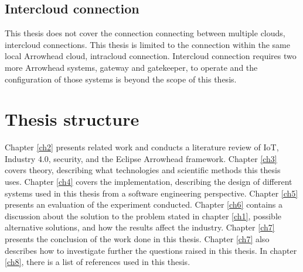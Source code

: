 \subsection{Intercloud connection}
This thesis does not cover the connection connecting between multiple clouds, intercloud connections. 
This thesis is limited to the connection within the same local Arrowhead cloud, intracloud connection.  
Intercloud connection requires two more Arrowhead systems, gateway and gatekeeper, to operate and the configuration of those systems is beyond the scope of this thesis.

\section{Thesis structure}
Chapter \ref{ch2} presents related work and conducts a literature review of IoT, Industry 4.0, security, and the Eclipse Arrowhead framework.
Chapter \ref{ch3} covers theory, describing what technologies and scientific methods this thesis uses.
Chapter \ref{ch4} covers the implementation, describing the design of different systems used in this thesis from a software engineering perspective.
Chapter \ref{ch5} presents an evaluation of the experiment conducted.
Chapter \ref{ch6} contains a discussion about the solution to the problem stated in chapter \ref{ch1}, possible alternative solutions, and how the results affect the industry.
Chapter \ref{ch7} presents the conclusion of the work done in this thesis. Chapter \ref{ch7} also describes how to investigate further the questions raised in this thesis. 
In chapter \ref{ch8}, there is a list of references used in this thesis.
